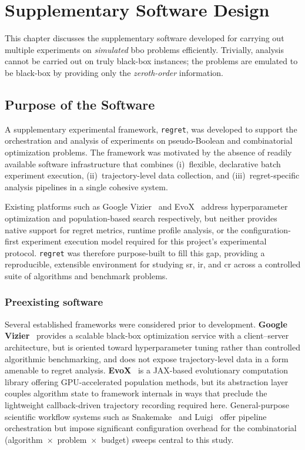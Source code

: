 \chapter{Supplementary Software Design}
\label{cha:design}
This chapter discusses the supplementary software developed for
carrying out multiple experiments on \textit{simulated} \acrshort{bbo}
problems efficiently. Trivially, analysis cannot be carried out on
truly black-box instances; the problems are emulated to be black-box
by providing only the \textit{zeroth-order} information.

\section{Purpose of the Software}
A supplementary experimental framework, \texttt{regret}, was developed to
support the orchestration and analysis of experiments on pseudo-Boolean and
combinatorial optimization problems. The framework was motivated by the
absence of readily available software infrastructure that combines (i)~flexible, declarative
batch experiment execution, (ii)~trajectory-level data collection, and
(iii)~regret-specific analysis pipelines in a single cohesive system.

Existing platforms such as Google Vizier~\cite{google_vizier} and
EvoX~\cite{evox} address hyperparameter optimization and population-based
search respectively, but neither provides native support for regret metrics,
runtime profile analysis, or the configuration-first experiment
execution model required
for this project's experimental protocol. \texttt{regret} was therefore
purpose-built to fill this gap, providing a reproducible, extensible
environment for studying \acrfull{sr}, \acrfull{ir}, and \acrfull{cr} across
a controlled suite of algorithms and benchmark problems.

\subsection{Preexisting software}
Several established frameworks were considered prior to development.
\textbf{Google Vizier}~\cite{google_vizier} provides a scalable black-box
optimization service with a client--server architecture, but is oriented
toward hyperparameter tuning rather than controlled algorithmic benchmarking,
and does not expose trajectory-level data in a form amenable to regret
analysis. \textbf{EvoX}~\cite{evox} is a JAX-based
evolutionary computation
library offering GPU-accelerated population methods, but its abstraction layer
couples algorithm state to framework internals in ways that preclude the
lightweight callback-driven trajectory recording required here.
General-purpose scientific workflow systems such as
Snakemake~\cite{snakemake} and Luigi~\cite{luigi_software} offer
pipeline orchestration but impose significant configuration overhead for the
combinatorial (algorithm~$\times$~problem~$\times$~budget) sweeps central to
this study.

